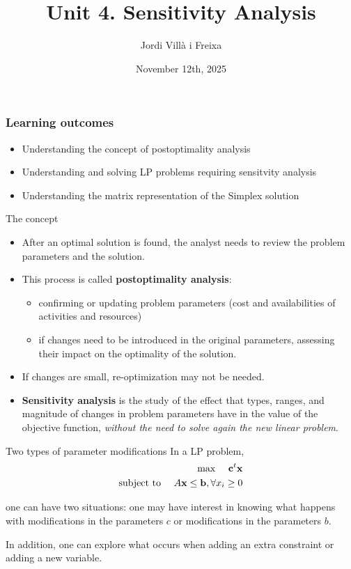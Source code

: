 \documentclass[c]{beamer}
\title[Introduction]{Unit 4. Sensitivity Analysis}
\author{Jordi Villà i Freixa}
\institute[FCTE]{
Universitat de Vic - Universitat Central de Catalunya \\
Study Abroad. Operations Research\\
\medskip
\textit{jordi.villa@uvic.cat}
}
\date{November 12th, 2025}
\begin{document}
\begin{frame}
\titlepage
\end{frame}




\begin{frame}
\frametitle{Learning outcomes}
\begin{itemize}
  \item Understanding the concept of postoptimality analysis
  \item Understanding and solving LP problems requiring sensitvity analysis
  \item Understanding the matrix representation of the Simplex solution
\end{itemize}
\end{frame}

\begin{frame}{The concept}
\begin{itemize}
  \item After an optimal solution is found, the analyst needs to review the problem parameters and the solution.
  \item This process is called {\bf postoptimality analysis}:
  \begin{itemize}
    \item confirming or updating problem parameters (cost and availabilities of activities and resources)
    \item if changes need to be introduced in the original parameters, assessing their impact on the optimality of the solution.
  \end{itemize}
  \item If changes are small, re-optimization may not be needed.
  \item {\bf Sensitivity analysis} is the study of the effect that types, ranges, and magnitude of changes in problem parameters have in the value of the objective function, {\em without the need to solve again the new linear problem}.
\end{itemize}
\end{frame}

\begin{frame}{Two types of parameter modifications}
  In a LP problem, 
\begin{eqnarray*}
 \text{max }\quad\textbf{c}^t \textbf{x}\\
 \text{subject to }\quad A\textbf{x}\leq \textbf{b}, \forall x_i\geq0
\end{eqnarray*}

one can have two situations: one may have interest in knowing what happens with modifications in the parameters $c$ or modifications in the parameters $b$.

In addition, one can explore what occurs when adding an extra constraint or adding a new variable.

\end{frame}
\end{document}
